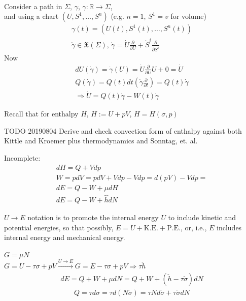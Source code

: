 \quad \\ 
Consider a path in $\Sigma$, $\gamma$, $\gamma : \mathbb{R} \to \Sigma$, \\
and using a chart $(U, S^1, \dots , S^n)$ (e.g. $n=1$, $S^1 = v$ for volume)
\[
\begin{gathered}
\gamma(t) = (U(t), S^1(t), \dots, S^n(t)) \\
\dot{\gamma} \in \mathfrak{X}(\Sigma), \, \dot{\gamma} = \dot{U} \frac{ \partial }{ \partial U} + \dot{S}^i \frac{ \partial }{ \partial S^i} 
\end{gathered}
\]
Now 
\[
\begin{gathered}
dU(\dot{\gamma}) = \dot{\gamma}(U) = \dot{U} \frac{ \partial }{ \partial U} U + 0 = \dot{U} \\
	Q(\dot{\gamma}) = Q(t) dt\left( \dot{\gamma} \frac{ \partial }{ \partial t} \right) = Q(t) \dot{\gamma} \\ 
	\Longrightarrow \dot{U} = Q(t) \dot{\gamma} - W(t) \dot{\gamma}
\end{gathered}
\]

Recall that for enthalpy $H$, $H := U + pV$, $H=H(\sigma, p)$

TODO 20190804 Derive and check convection form of enthalpy against both Kittle and Kroemer plus thermodynamics and Sonntag, et. al. 

Incomplete:
\[
\begin{gathered} 
dH = Q + Vdp \\
W = pdV = pdV + Vdp - Vdp = d(pV) - Vdp = \\
dE = Q-W + \mu dH \\
dE = Q- W + \widehat{h} dN
\end{gathered} 
\]

$U \to E$ notation is to promote the internal energy $U$ to include kinetic and potential energies, so that possibly, $E = U + \text{K.E.} + \text{P.E.}$, or, i.e., $E$ includes internal energy and mechanical energy.

$G = \mu N$ \\
$G = U - \tau \sigma + pV \xrightarrow{U \to E} G = E-\tau \sigma + pV \Longrightarrow \tau \check{h}$
\[
\begin{gathered}
dE = Q + W + \mu dN = Q + W + (\check{h} - \tau \check{\sigma})dN
\end{gathered}
\]
\[
\begin{gathered}
Q = \tau d\sigma = \tau d(N \check{\sigma}) = \tau N d\check{\sigma} + \tau \check{\sigma} dN
\end{gathered}
\]

